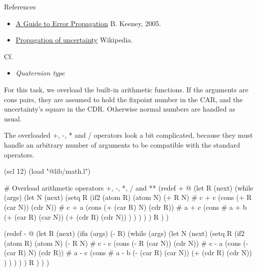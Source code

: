 \begin{description}
\item[References]
\end{description}

\begin{itemize}
\item
  \href{http://casa.colorado.edu/~benderan/teaching/astr3510/stats.pdf}{A
  Guide to Error Propagation} B. Keeney, 2005.
\item
  \href{http://en.wikipedia.org/wiki/Propagation\_of\_uncertainty}{Propagation
  of uncertainty} Wikipedia.
\end{itemize}

\begin{description}
\item[Cf.]
\end{description}

\begin{itemize}
\item
  \emph{Quaternion type}
\end{itemize}


\begin{wideverbatim}

For this task, we overload the built-in arithmetic functions. If the arguments
are cons pairs, they are assumed to hold the fixpoint number in the CAR, and the
uncertainty's square in the CDR. Otherwise normal numbers are handled as usual.

The overloaded +, -, * and / operators look a bit complicated, because they must
handle an arbitrary number of arguments to be compatible with the standard
operators.

(scl 12)
(load "@lib/math.l")

# Overload arithmetic operators +, -, *, / and **
(redef + @
   (let R (next)
      (while (args)
         (let N (next)
            (setq R
               (if2 (atom R) (atom N)
                  (+ R N)                       # c + c
                  (cons (+ R (car N)) (cdr N))  # c + a
                  (cons (+ (car R) N) (cdr R))  # a + c
                  (cons                         # a + b
                     (+ (car R) (car N))
                     (+ (cdr R) (cdr N)) ) ) ) ) )
      R ) )

(redef - @
   (let R (next)
      (ifn (args)
         (- R)
         (while (args)
            (let N (next)
               (setq R
                  (if2 (atom R) (atom N)
                     (- R N)                       # c - c
                     (cons (- R (car N)) (cdr N))  # c - a
                     (cons (- (car R) N) (cdr R))  # a - c
                     (cons                         # a - b
                        (- (car R) (car N))
                        (+ (cdr R) (cdr N)) ) ) ) ) )
         R ) ) )


\end{wideverbatim}

